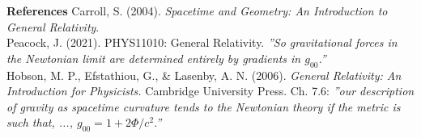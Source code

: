 \begin{technical}
\vspace{0.5em}
\noindent\textbf{References}  
Carroll, S. (2004). \textit{Spacetime and Geometry: An Introduction to General Relativity}. \\
Peacock, J. (2021). PHYS11010: General Relativity. \textit{''So gravitational forces in the Newtonian limit are determined entirely by gradients in $g_{00}$.''}\\
Hobson, M. P., Efstathiou, G., \& Lasenby, A. N. (2006). \textit{General Relativity: An Introduction for Physicists.} Cambridge University Press. Ch. 7.6: \textit{''our description of gravity as spacetime curvature tends to the Newtonian theory if the metric is such that, ..., $g_{00} = 1 + 2\Phi/c^2$.''}
\end{technical}